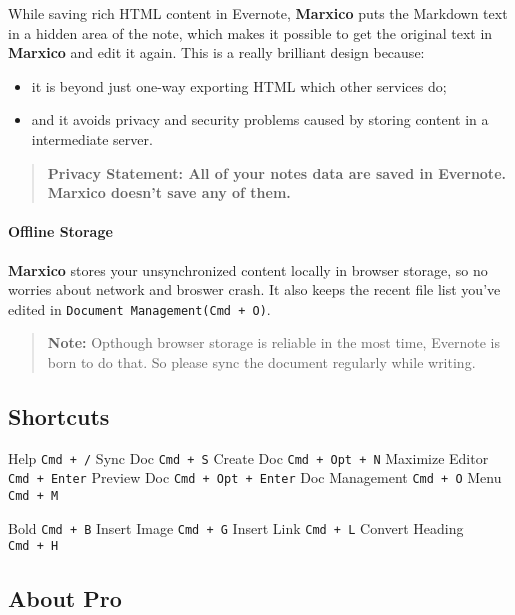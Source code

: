 While saving rich HTML content in Evernote, \textbf{Marxico} puts the
Markdown text in a hidden area of the note, which makes it possible to
get the original text in \textbf{Marxico} and edit it again. This is a
really brilliant design because:

\begin{itemize}
\tightlist
\item
  it is beyond just one-way exporting HTML which other services do;
\item
  and it avoids privacy and security problems caused by storing content
  in a intermediate server.
\end{itemize}

\begin{quote}
\textbf{Privacy Statement: All of your notes data are saved in Evernote.
Marxico doesn't save any of them.}
\end{quote}

\paragraph{Offline Storage}\label{offline-storage}

\textbf{Marxico} stores your unsynchronized content locally in browser
storage, so no worries about network and broswer crash. It also keeps
the recent file list you've edited in
\texttt{Document\ Management(Cmd\ +\ O)}.

\begin{quote}
\textbf{Note:} Opthough browser storage is reliable in the most time,
Evernote is born to do that. So please sync the document regularly while
writing.
\end{quote}

\subsection{Shortcuts}\label{shortcuts}

Help \texttt{Cmd\ +\ /} Sync Doc \texttt{Cmd\ +\ S} Create Doc
\texttt{Cmd\ +\ Opt\ +\ N} Maximize Editor \texttt{Cmd\ +\ Enter}
Preview Doc \texttt{Cmd\ +\ Opt\ +\ Enter} Doc Management
\texttt{Cmd\ +\ O} Menu \texttt{Cmd\ +\ M}

Bold \texttt{Cmd\ +\ B} Insert Image \texttt{Cmd\ +\ G} Insert Link
\texttt{Cmd\ +\ L} Convert Heading \texttt{Cmd\ +\ H}

\subsection{About Pro}\label{about-pro}

